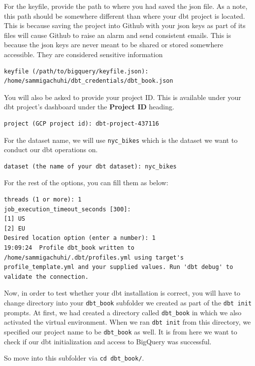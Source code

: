 \documentclass[
]{book}
\begin{document}
For the keyfile, provide the path to where you had saved the json file. As a note, this path should be somewhere different than where your dbt project is located. This is because saving the project into Github with your json keys as part of its files will cause Github to raise an alarm and send consistent emails. This is because the json keys are never meant to be shared or stored somewhere accessible. They are considered sensitive information

\begin{verbatim}
keyfile (/path/to/bigquery/keyfile.json): /home/sammigachuhi/dbt_credentials/dbt_book.json
\end{verbatim}

You will also be asked to provide your project ID. This is available under your dbt project's dashboard under the \textbf{Project ID} heading.

\begin{verbatim}
project (GCP project id): dbt-project-437116
\end{verbatim}

For the dataset name, we will use \texttt{nyc\_bikes} which is the dataset we want to conduct our dbt operations on.

\begin{verbatim}
dataset (the name of your dbt dataset): nyc_bikes
\end{verbatim}

For the rest of the options, you can fill them as below:

\begin{verbatim}
threads (1 or more): 1
job_execution_timeout_seconds [300]: 
[1] US
[2] EU
Desired location option (enter a number): 1
19:09:24  Profile dbt_book written to /home/sammigachuhi/.dbt/profiles.yml using target's profile_template.yml and your supplied values. Run 'dbt debug' to validate the connection.
\end{verbatim}

Now, in order to test whether your dbt installation is correct, you will have to change directory into your \texttt{dbt\_book} subfolder we created as part of the \texttt{dbt\ init} prompts. At first, we had created a directory called \texttt{dbt\_book} in which we also activated the virtual environment. When we ran \texttt{dbt\ init} from this directory, we specified our project name to be \texttt{dbt\_book} as well. It is from here we want to check if our dbt initialization and access to BigQuery was successful.

So move into this subfolder via \texttt{cd\ dbt\_book/}.
\end{document}
